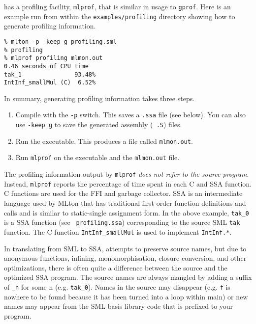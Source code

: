 
{\mlton} has a profiling facility, {\tt mlprof}, that is similar in usage
to {\tt gprof}.  Here is an example run from within the {\tt examples/profiling}
directory showing how to generate profiling information.

\begin{verbatim}
% mlton -p -keep g profiling.sml
% profiling
% mlprof profiling mlmon.out
0.46 seconds of CPU time
tak_1               93.48%
IntInf_smallMul (C)  6.52%
\end{verbatim}
In summary, generating profiling information takes three steps.
\begin{enumerate}

\item Compile with the {\tt -p} switch.  This saves a {\tt .ssa} file (see
below).  You can also use {\tt -keep g} to save the generated assembly ({\tt
.S}) files.

\item Run the executable.  This produces a file called {\tt mlmon.out}.

\item Run {\tt mlprof} on the executable and the {\tt mlmon.out} file.

\end{enumerate}
The profiling information output by {\tt mlprof} {\em does not refer to the
source program}.  Instead, {\tt mlprof} reports the percentage of time spent in
each C and SSA function.  C functions are used for the FFI and garbage
collector.  SSA is an intermediate language used by MLton that has traditional
first-order function definitions and calls and is similar to static-single
assignment form.  In the above example, {\tt tak\_0} is a SSA function (see {\tt
profiling.ssa}) corresponding to the source SML {\tt tak} function.  The C
function {\tt IntInf\_smallMul} is used to implement {\tt IntInf.*}.

In translating from SML to SSA, {\mlton} attempts to preserve source names, but
due to anonymous functions, inlining, monomorphisation, closure conversion, and
other optimizations, there is often quite a difference between the source and
the optimized SSA program.  The source names are always mangled by adding a
suffix of {\tt \_n} for some n (e.g. {\tt tak\_0}).  Names in the source may
disappear (e.g. {\tt f} is nowhere to be found because it has been turned into a
loop within main) or new names may appear from the SML basis library code that
is prefixed to your program.

